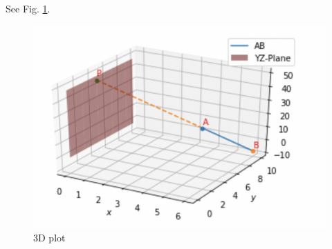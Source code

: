 See Fig.      \ref{aug/2/19/plot}.
\begin{figure}[!hb]
    \centering
         \includegraphics[width=\columnwidth]{solutions/aug/2/19/figures/figure.png}
         \caption{3D plot}
         \label{aug/2/19/plot}
\end{figure}

